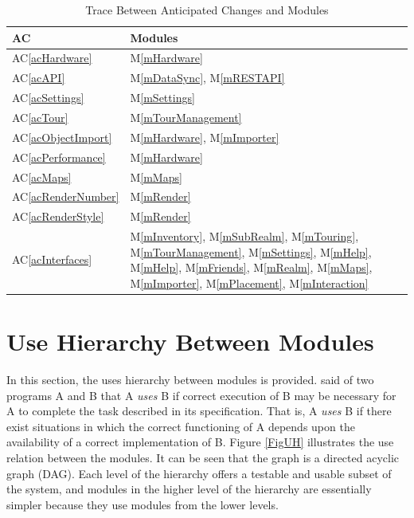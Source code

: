 \documentclass[12pt, titlepage]{article}
\newcommand{\acref}[1]{AC\ref{#1}}
\newcommand{\mref}[1]{M\ref{#1}}
\begin{document}
\begin{table}[H]
\centering
\begin{tabular}{p{} p{}}
\toprule
\textbf{AC} & \textbf{Modules}\\
\midrule
\acref{acHardware} & \mref{mHardware}\\
\acref{acAPI} & \mref{mDataSync}, \mref{mRESTAPI}\\
\acref{acSettings} & \mref{mSettings}\\
\acref{acTour} & \mref{mTourManagement}\\
\acref{acObjectImport} & \mref{mHardware}, \mref{mImporter}\\
\acref{acPerformance} & \mref{mHardware}\\
\acref{acMaps} & \mref{mMaps}\\
\acref{acRenderNumber} & \mref{mRender}\\
\acref{acRenderStyle} & \mref{mRender}\\
\acref{acInterfaces} & \mref{mInventory}, \mref{mSubRealm}, \mref{mTouring}, \mref{mTourManagement}, \mref{mSettings}, \mref{mHelp}, \mref{mHelp}, \mref{mFriends}, \mref{mRealm}, \mref{mMaps}, \mref{mImporter}, \mref{mPlacement}, \mref{mInteraction}\\
\bottomrule
\end{tabular}
\caption{Trace Between Anticipated Changes and Modules}
\label{TblACT}
\end{table}

\newpage

\section{Use Hierarchy Between Modules} \label{SecUse}

In this section, the uses hierarchy between modules is
provided. \citet{Parnas1978} said of two programs A and B that A {\em uses} B if
correct execution of B may be necessary for A to complete the task described in
its specification. That is, A {\em uses} B if there exist situations in which
the correct functioning of A depends upon the availability of a correct
implementation of B.  Figure \ref{FigUH} illustrates the use relation between
the modules. It can be seen that the graph is a directed acyclic graph
(DAG). Each level of the hierarchy offers a testable and usable subset of the
system, and modules in the higher level of the hierarchy are essentially simpler
because they use modules from the lower levels.
\end{document}
